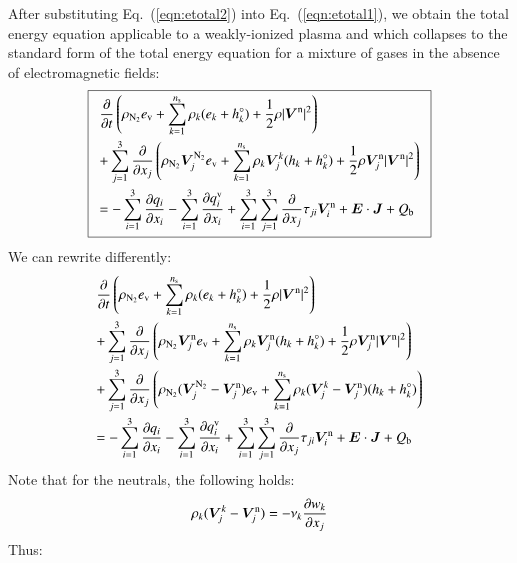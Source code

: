 \documentclass{warpdoc}
\newcommand\frameeqn[1]{\fbox{$\displaystyle #1$}}
\newcommand{\alb}{\vspace{0.1cm}\\} %
\newcommand{\mfd}{\displaystyle}
\newcommand{\ns}{{n_{\rm s}}}
\newcommand{\ev}{{e_{\rm v}}}
\renewcommand{\vec}[1]{\bm{#1}}
\begin{document}
After substituting Eq.\ (\ref{eqn:etotal2}) into Eq.\ (\ref{eqn:etotal1}), we obtain the total energy equation applicable to a weakly-ionized plasma and which collapses to the standard form of the total energy equation for a mixture of gases in the absence of electromagnetic fields:
%
\begin{equation}
\frameeqn{
\begin{array}{l}\mfd
 \frac{\partial }{\partial t}\left(\rho_{\rm N_2} \ev+\sum_{k=1}^\ns \rho_k (e_k+h_k^\circ)+\frac{1}{2}\rho|\vec{V}^{\rm n}|^2 \right) \alb\mfd
+ \sum_{j=1}^3  \frac{\partial }{\partial x_j} \left(\rho_{\rm N_2} \vec{V}_j^{\rm N_2} \ev + \sum_{k=1}^\ns \rho_k \vec{V}^k_j (h_k+h_k^\circ)+\frac{1}{2}\rho \vec{V}^{\rm n}_j|\vec{V}^{\rm n}|^2 \right)
 \alb\mfd
=
-\sum_{i=1}^{3}\frac{\partial q_i}{\partial x_i}
-\sum_{i=1}^{3}\frac{\partial q_i^{\rm v}}{\partial x_i}
+\sum_{i=1}^3 \sum_{j=1}^3  \frac{\partial }{\partial x_j} \tau_{ji} \vec{V}_i^{\rm n}
+ \vec{E}\cdot\vec{J}
+ Q_{\rm b}
\end{array}
}
\label{eqn:etotal4}
\end{equation}
%  
We can rewrite differently:
%
\begin{equation}
\begin{array}{l}\mfd
 \frac{\partial }{\partial t}\left(\rho_{\rm N_2} \ev+\sum_{k=1}^\ns \rho_k (e_k+h_k^\circ)+\frac{1}{2}\rho|\vec{V}^{\rm n}|^2 \right) \alb\mfd
+ \sum_{j=1}^3  \frac{\partial }{\partial x_j} \left(\rho_{\rm N_2} \vec{V}_j^{\rm n} \ev + \sum_{k=1}^\ns \rho_k \vec{V}^{\rm n}_j (h_k+h_k^\circ)+\frac{1}{2}\rho \vec{V}^{\rm n}_j|\vec{V}^{\rm n}|^2 \right)\alb\mfd
+ \sum_{j=1}^3  \frac{\partial }{\partial x_j} \left(\rho_{\rm N_2} (\vec{V}_j^{\rm N_2}-\vec{V}_j^{\rm n}) \ev + \sum_{k=1}^\ns \rho_k (\vec{V}^k_j-\vec{V}^{\rm n}_j) (h_k+h_k^\circ) \right)
 \alb\mfd
=
-\sum_{i=1}^{3}\frac{\partial q_i}{\partial x_i}
-\sum_{i=1}^{3}\frac{\partial q_i^{\rm v}}{\partial x_i}
+\sum_{i=1}^3 \sum_{j=1}^3  \frac{\partial }{\partial x_j} \tau_{ji} \vec{V}_i^{\rm n}
+ \vec{E}\cdot\vec{J}
+ Q_{\rm b}
\end{array}
\label{eqn:etotal5}
\end{equation}
%  
Note that for the neutrals, the following holds:
%
\begin{equation}
\rho_k (\vec{V}_j^k-\vec{V}_j^{\rm n}) =  - \nu_k \frac{\partial w_k}{\partial x_j}
\end{equation}
%
Thus:
%
\end{document}
